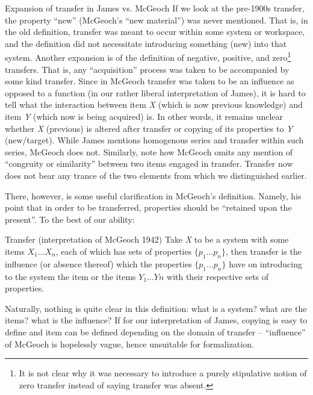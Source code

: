 \documentclass{article}
\begin{document}
\pex Expansion of transfer in James vs. McGeoch
\a If we look at the pre-1900s transfer, the property ``new'' (McGeoch’s ``new material'') was never mentioned. That is, in the old definition, transfer was meant to occur within some system or workspace, and the definition did not necessitate introducing something (new) into that system.
\a Another expansion is of the definition of negative, positive, and zero\footnote{It is not clear why it was necessary to introduce a purely stipulative notion of zero transfer instead of saying transfer was absent.} transfers. That is, any ``acquisition'' process was taken to be accompanied by some kind transfer.
\a Since in McGeoch transfer was taken to be an influence as opposed to a function (in our rather liberal interpretation of James), it is hard to tell what the interaction between item \textit{X} (which is now previous knowledge) and item \textit{Y} (which now is being acquired) is. In other words, it remains unclear whether \textit{X} (previous) is altered after transfer or copying of its properties to \textit{Y} (new/target).  
\a While James mentions homogenous series and transfer within such series, McGeoch does not. Similarly, note how McGeoch omits any mention of ``congruity or similarity'' between two items engaged in transfer. Transfer now does not bear any trance of the two elements from \cite{priestley_hartleys_1790} which we distinguished earlier. 
\xe 

There, however, is some useful clarification in McGeoch’s definition. Namely, his point that in order to be transferred, properties should be ``retained upon the present''. To the best of our ability:

\pex Transfer (interpretation of McGeoch 1942)
\a Take \textit{X} to be a system with some items $X_1...X_n$, each of which has sets of properties $\{p_1...p_n\}$, 
\a then transfer is the influence (or absence thereof) which the properties $\{p_1...p_n\}$ have on introducing to the system the item or the items $Y_1...Yn$ with their respective sets of properties.
\xe

Naturally, nothing is quite clear in this definition: what is a system? what are the items? what is the influence? If for our interpretation of James, copying is easy to define and item can be defined depending on the domain of transfer -- ``influence'' of McGeoch is hopelessly vague, hence unsuitable for formalization.
\end{document}

